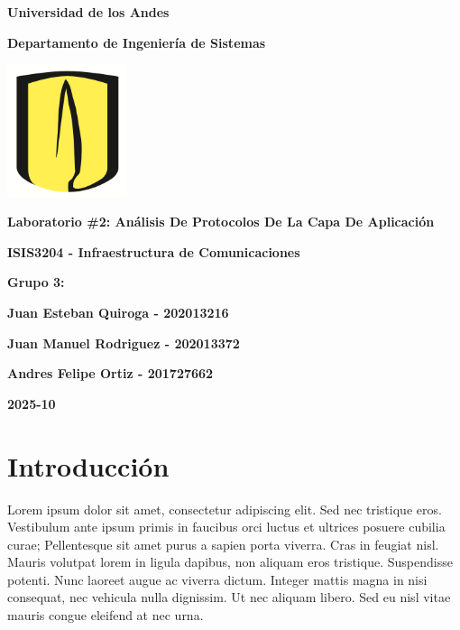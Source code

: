 \documentclass[10pt]{article}
\title{ }
\begin{document}
\begingroup
\let\clearpage\relax %
\thispagestyle{empty}
\begin{center}
{\huge \bfseries Universidad de los Andes}

\vspace{25pt}
{\LARGE \bfseries Departamento de Ingeniería de Sistemas}

\vspace{15pt}
\includegraphics[width=100pt]{images/logo.png} 

\vspace{35pt}
{\LARGE \bfseries Laboratorio \#2: Análisis De Protocolos De La Capa De Aplicación}
\vspace{55pt}

{\Large \bfseries ISIS3204 - Infraestructura de Comunicaciones}


\vspace{100pt}
{\Large \bfseries Grupo 3: }

\end{center}

\begin{flushleft}
  \setlength{\parskip}{0pt}
  \setlength{\itemsep}{0pt}
  \hspace*{4cm}\large\bfseries Juan Esteban Quiroga - 202013216

  \hspace*{4cm}\large\bfseries Juan Manuel Rodriguez - 202013372

  \hspace*{4cm}\large\bfseries Andres Felipe Ortiz - 201727662
\end{flushleft}

\begin{center}
\vspace{60pt}

\Large\bfseries 2025-10
\end{center}

\mbox{}
\endgroup

\clearpage

\tableofcontents
\clearpage


\renewcommand{\thesection}{\arabic{section}}
\section*{Introducción}
Lorem ipsum dolor sit amet, consectetur adipiscing elit. Sed nec tristique eros. Vestibulum ante ipsum primis in faucibus orci luctus et ultrices posuere cubilia curae; Pellentesque sit amet purus a sapien porta viverra. Cras in feugiat nisl. Mauris volutpat lorem in ligula dapibus, non aliquam eros tristique. Suspendisse potenti. Nunc laoreet augue ac viverra dictum. Integer mattis magna in nisi consequat, nec vehicula nulla dignissim. Ut nec aliquam libero. Sed eu nisl vitae mauris congue eleifend at nec urna.
\end{document}
